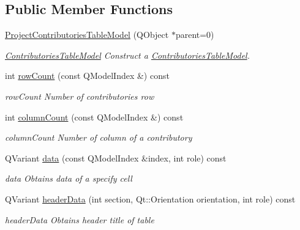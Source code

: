 \subsection*{Public Member Functions}
\begin{DoxyCompactItemize}
\item 
\hyperlink{classGui_1_1Widgets_1_1WdgModels_1_1ProjectContributoriesTableModel_abb9a482809fb18cf5bbc94d3de608e80}{Project\-Contributories\-Table\-Model} (Q\-Object $\ast$parent=0)
\begin{DoxyCompactList}\small\item\em \hyperlink{classGui_1_1Widgets_1_1WdgModels_1_1ContributoriesTableModel}{Contributories\-Table\-Model} Construct a \hyperlink{classGui_1_1Widgets_1_1WdgModels_1_1ContributoriesTableModel}{Contributories\-Table\-Model}. \end{DoxyCompactList}\item 
int \hyperlink{classGui_1_1Widgets_1_1WdgModels_1_1ProjectContributoriesTableModel_a89017ec04ab8bb1669f05a1dc45a6496}{row\-Count} (const Q\-Model\-Index \&) const 
\begin{DoxyCompactList}\small\item\em row\-Count Number of contributories row \end{DoxyCompactList}\item 
int \hyperlink{classGui_1_1Widgets_1_1WdgModels_1_1ProjectContributoriesTableModel_a9c4e040dd182d0f3d7a0a3835ca0de2e}{column\-Count} (const Q\-Model\-Index \&) const 
\begin{DoxyCompactList}\small\item\em column\-Count Number of column of a contributory \end{DoxyCompactList}\item 
Q\-Variant \hyperlink{classGui_1_1Widgets_1_1WdgModels_1_1ProjectContributoriesTableModel_a4848c1f82ecaa85f49f410539a8d5a56}{data} (const Q\-Model\-Index \&index, int role) const 
\begin{DoxyCompactList}\small\item\em data Obtains data of a specify cell \end{DoxyCompactList}\item 
Q\-Variant \hyperlink{classGui_1_1Widgets_1_1WdgModels_1_1ProjectContributoriesTableModel_af1d71ae6a06b69264301744beca91ad9}{header\-Data} (int section, Qt\-::\-Orientation orientation, int role) const 
\begin{DoxyCompactList}\small\item\em header\-Data Obtains header title of table \end{DoxyCompactList}\item 

\end{DoxyCompactItemize}
